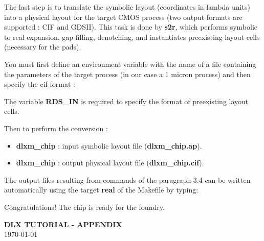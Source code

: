 The last step is to translate the symbolic layout (coordinates in lambda units) into a physical layout for the target CMOS process (two output formats are supported : CIF and GDSII). This task is done by {\bf s2r}, which performs symbolic to real expansion, gap filling, denotching, and instantiates preexisting layout cells (necessary for the pads).

You must first define an environment variable with the name of a file containing the parameters of the target process (in our case a 1 micron process) 
and then specify the cif format :



The variable {\bf RDS\_IN} is required to specify the format of preexisting layout cells.

Then to perform the conversion :


\begin{itemize}
\item
{\bf dlxm\_chip} : input symbolic layout file ({\bf dlxm\_chip.ap}).
\item
{\bf dlxm\_chip} : output physical layout file ({\bf dlxm\_chip.cif}).
\end{itemize}

The output files resulting from commands of the paragraph 3.4 can be written automatically using the target {\bf real} of the Makefile by typing:


Congratulations$!$ The chip is ready for the foundry.


\newpage

\begin{center}
{\Large \bf DLX TUTORIAL - APPENDIX}\\
\today \\
\end{center}

